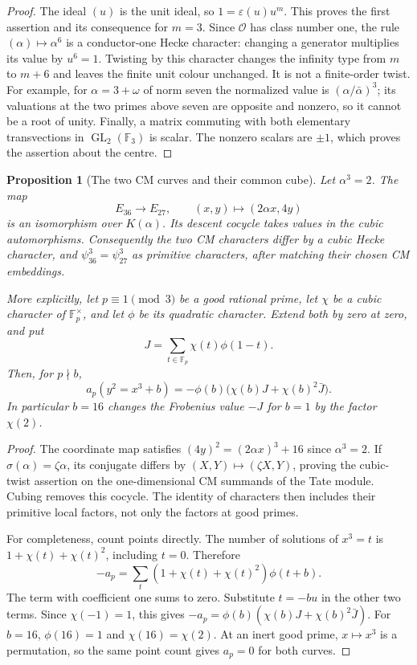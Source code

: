 \documentclass[11pt]{article}
\newtheorem{proposition}[theorem]{Proposition}
\theoremstyle{definition}
\theoremstyle{remark}
\begin{document}
\begin{proof}
The ideal $(u)$ is the unit ideal, so
$1=\varepsilon(u)u^m$.  This proves the first assertion and its
consequence for $m=3$.  Since $\mathcal O$ has class number one, the rule
$(\alpha)\mapsto\alpha^6$ is a conductor-one Hecke character: changing
a generator multiplies its value by $u^6=1$.  Twisting by this character
changes the infinity type from $m$ to $m+6$ and leaves the finite unit
colour unchanged.  It is not a finite-order twist.  For example, for
$\alpha=3+\omega$ of norm seven the normalized value is
$(\alpha/\bar\alpha)^3$; its valuations at the two primes above seven
are opposite and nonzero, so it cannot be a root of unity.
Finally, a matrix commuting with both elementary transvections in
$\operatorname{GL}_2(\mathbb F_3)$ is scalar.  The nonzero scalars are
$\pm1$, which proves the assertion about the centre.
\end{proof}

\begin{proposition}[The two CM curves and their common cube]
\label{prop:twist}
Let $\alpha^3=2$.  The map
\[
 E_{36}\longrightarrow E_{27},\qquad (x,y)\longmapsto(2\alpha x,4y)
\]
is an isomorphism over $K(\alpha)$.  Its descent cocycle takes values in
the cubic automorphisms.  Consequently the two CM characters differ by
a cubic Hecke character, and
$\psi_{36}^{3}=\psi_{27}^{3}$ as primitive characters, after matching
their chosen CM embeddings.

More explicitly, let $p\equiv1\pmod3$ be a good rational prime, let
$\chi$ be a cubic character of $\mathbb F_p^\times$, and let $\phi$ be
its quadratic character.  Extend both by zero at zero, and put
\[
 J=\sum_{t\in\mathbb F_p}\chi(t)\phi(1-t).
\]
Then, for $p\nmid b$,
\begin{equation}\label{eq:jacobi}
 a_p(y^2=x^3+b)=-\phi(b)
       \bigl(\chi(b)J+\chi(b)^2\bar J\bigr).
\end{equation}
In particular $b=16$ changes the Frobenius value $-J$ for $b=1$ by
the factor $\chi(2)$.
\end{proposition}

\begin{proof}
The coordinate map satisfies
$(4y)^2=(2\alpha x)^3+16$ since $\alpha^3=2$.
If $\sigma(\alpha)=\zeta\alpha$, its conjugate differs by
$(X,Y)\mapsto(\zeta X,Y)$, proving the cubic-twist assertion on the
one-dimensional CM summands of the Tate module.  Cubing removes this
cocycle.  The identity of characters then includes their primitive local
factors, not only the factors at good primes.

For completeness, count points directly.  The number of solutions of
$x^3=t$ is $1+\chi(t)+\chi(t)^2$, including $t=0$.  Therefore
\[
 -a_p=\sum_t(1+\chi(t)+\chi(t)^2)\phi(t+b).
\]
The term with coefficient one sums to zero.  Substitute $t=-bu$ in
the other two terms.  Since $\chi(-1)=1$, this gives
$-a_p=\phi(b)(\chi(b)J+\chi(b)^2\bar J)$.
For $b=16$, $\phi(16)=1$ and $\chi(16)=\chi(2)$.
At an inert good prime, $x\mapsto x^3$ is a permutation, so the same
point count gives $a_p=0$ for both curves.
\end{proof}
\end{document}
